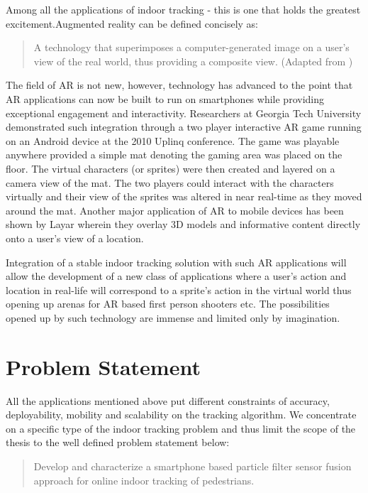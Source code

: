 Among all the applications of indoor tracking - this is one that holds the 
greatest excitement.Augmented reality can be defined concisely as:
\begin{quote}
A technology that superimposes a computer-generated image on a user's view of
the real world, thus providing a composite view. (Adapted from \cite{SciDict})
\end{quote}

The field of AR is not new, however, technology has advanced to the point that
AR applications can now be built to run on smartphones while providing
exceptional engagement and interactivity. Researchers at Georgia Tech University
demonstrated such integration through a two player interactive AR game running
on an Android device at the 2010 Uplinq conference. The game was playable
anywhere provided a simple mat denoting the gaming area was placed on the floor.
The virtual characters (or sprites) were then created and layered on a camera
view of the mat. The two players could interact with the characters virtually
and their view of the sprites was altered in near real-time as they moved around
the mat. Another major application of AR to mobile devices has been shown by 
Layar wherein they overlay 3D models and informative content directly onto 
a user's view of a location. 

Integration of a stable indoor tracking solution with such AR applications will
allow the development of a new class of applications where a user's action and
location in real-life will correspond to a sprite's action in the virtual world
thus opening up arenas for AR based first person shooters etc. The possibilities
opened up by such technology are immense and limited only by imagination.


\section{Problem Statement}
All the applications mentioned above put different constraints of accuracy,
deployability, mobility and scalability on the tracking algorithm. We
concentrate on a specific type of the indoor tracking problem and thus limit
the scope of the thesis to the well defined problem statement below:

\begin{quote}
Develop and characterize a smartphone based particle filter sensor fusion
approach for online indoor tracking of pedestrians. 
\end{quote}


